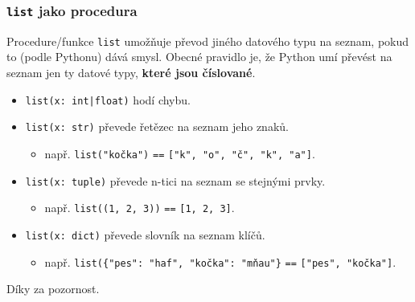 \documentclass[aspectratio=169,11pt]{beamer}
\begin{document}
\begin{frame}
 \frametitle{\texttt{list} jako procedura}
 Procedure/funkce \texttt{\alert{list}} umožňuje převod jiného datového typu na
 seznam, pokud to (podle Pythonu) dává smysl. Obecné pravidlo je, že Python umí
 převést na seznam jen ty datové typy, \textbf{které jsou číslované}.
 \begin{itemize}
  \item<1-> \texttt{list(x: \alert{int}|\alert{float})} hodí chybu.
  \item<2-> \texttt{list(x: \alert{str})} převede řetězec na seznam jeho znaků.
   \begin{itemize}
    \item např. \texttt{list("kočka")} \texttt{==} \texttt{["k", "o", "č", "k",
     "a"]}.
   \end{itemize}
  \item<3-> \texttt{list(x: \alert{tuple})} převede n-tici na seznam se stejnými
   prvky.
   \begin{itemize}
    \item např. \texttt{list((1, 2, 3))} \texttt{==} \texttt{[1, 2, 3]}.
   \end{itemize}
  \item<4-> \texttt{list(x: \alert{dict})} převede slovník na seznam klíčů.
   \begin{itemize}
    \item např. \texttt{list(\{"pes": "haf", "kočka": "mňau"\}} \texttt{==}
     \texttt{["pes", "kočka"]}.
   \end{itemize}
 \end{itemize}
\end{frame}

\begin{frame}[plain]
 \centering\Huge Díky za pozornost.
\end{frame}
\end{document}
